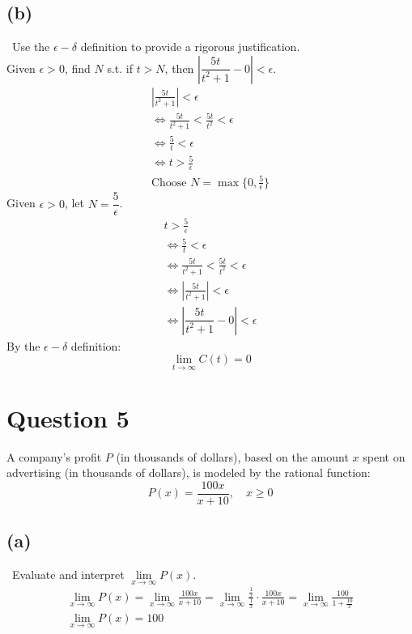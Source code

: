 \documentclass[12pt]{article}
\begin{document}
\subsection{(b)} \, Use the $\epsilon - \delta$ definition to provide a rigorous justification.\\
Given $\epsilon > 0$, find $N$ s.t. if $t>N$, then $|\dfrac{5t}{t^2+1}-0|<\epsilon$.
\begin{gather*}
    |\frac{5t}{t^2+1}|<\epsilon\\
    \iff \frac{5t}{t^2+1}<\frac{5t}{t^2} < \epsilon\\
    \iff \frac{5}{t} < \epsilon\\
    \iff t>\frac{5}{\epsilon }\\
    \boxed{\text{Choose }N = \max \{0, \frac{5}{\epsilon} \} }
\end{gather*}
Given $\epsilon>0$, let $N=\dfrac{5}{\epsilon}$.
\begin{gather*}
    t>\frac{5}{\epsilon}\\
    \iff \frac{5}{t} < \epsilon\\
    \iff \frac{5t}{t^2+1}<\frac{5t}{t^2} < \epsilon\\
    \iff |\frac{5t}{t^2+1}|<\epsilon\\
    \iff |\dfrac{5t}{t^2+1}-0|<\epsilon
\end{gather*}
By the $\epsilon - \delta$ definition:
\[
\boxed{\lim_{t \to \infty}C(t)=0}
\]

\section{Question 5}
A company’s profit $P$ (in thousands of dollars), based on the amount $x$ spent on advertising (in thousands
of dollars), is modeled by the rational function:
\[
P(x)=\frac{100x}{x+10}, \quad x \ge 0
\]

\subsection{(a)} \, Evaluate and interpret $\lim\limits_{x \to \infty} P(x)$.
\begin{gather*}
    \lim_{x \to \infty} P(x) = \lim_{x \to \infty} \frac{100x}{x+10} = \lim_{x \to \infty} \frac{\frac{1}{x}}{\frac{1}{x}} \cdot\frac{100x}{x+10} = \lim_{x \to \infty} \frac{100}{1+\frac{10}{x}}\\
    \boxed{\lim_{x \to \infty} P(x)=100}
\end{gather*}
\end{document}

